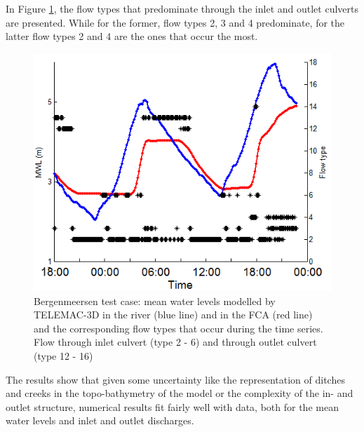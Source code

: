 In Figure \ref{fig:bergenmeersen_figure9}, the flow types that predominate through the inlet and outlet culverts are presented.
While for the former, flow types 2, 3 and 4 predominate, for the latter flow types 2 and 4 are the ones that occur the most.

\begin{figure}[H]
\begin{center}
  \includegraphics[scale=1]{img/figure9.png}
\end{center}
\caption{Bergenmeersen test case: mean water levels modelled by TELEMAC-3D in the river (blue line)
and in the FCA (red line) and the corresponding flow types that occur during the time series.
Flow through inlet culvert (type 2 - 6) and through outlet culvert (type 12 - 16)}
\label{fig:bergenmeersen_figure9}
\end{figure}

The results show that given some uncertainty like the representation of ditches and creeks in the topo-bathymetry of the model
or the complexity of the in- and outlet structure, numerical results fit fairly well with data,
both for the mean water levels and inlet and outlet discharges.

%



